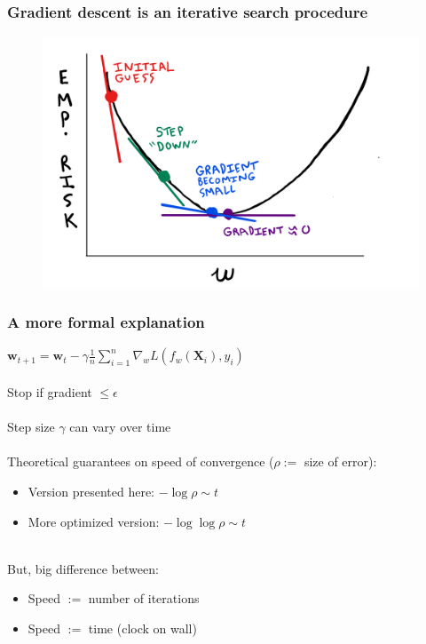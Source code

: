 \documentclass{beamer}
\begin{document}
\begin{frame}
	\frametitle{Gradient descent is an iterative search procedure}
	\begin{figure}[h]
	\centering
	\includegraphics[scale=0.33]{Sketch}
	\end{figure}
\end{frame}

\begin{frame}
	\frametitle{A more formal explanation}

	$\mathbf{w}_{t+1} = \mathbf{w}_t - \gamma \frac{1}{n}\sum_{i=1}^n
	\nabla_w L(f_w(\mathbf{X}_i), y_i)$ \\~\\

	Stop if gradient $\leq \epsilon$ \\~\\

	Step size $\gamma$ can vary over time \\~\\

	Theoretical guarantees on speed of convergence ($\rho :=$ size of error):
	\begin{itemize}
		\item Version presented here: $ - \log \rho \sim t$
		\item More optimized version: $ - \log \log \rho \sim t$ \\~\\
	\end{itemize}
	
	But, big difference between:
	\begin{itemize}
		\item Speed $:=$ number of iterations
		\item Speed $:=$ time (clock on wall)
	\end{itemize}
\end{frame}
\end{document}
